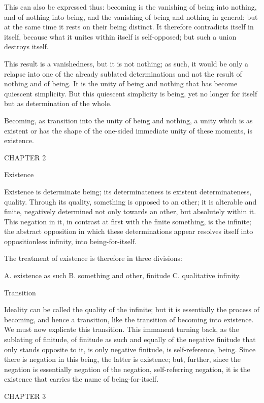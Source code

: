 This can also be expressed thus:
becoming is the vanishing of being into nothing,
and of nothing into being,
and the vanishing of being and nothing in general;
but at the same time it rests on their being distinct.
It therefore contradicts itself in itself,
because what it unites within itself is self-opposed;
but such a union destroys itself.

This result is a vanishedness, but it is not nothing;
as such, it would be only a relapse into one of
the already sublated determinations
and not the result of nothing and of being.
It is the unity of being and nothing
that has become quiescent simplicity.
But this quiescent simplicity is being,
yet no longer for itself but as determination of the whole.

Becoming, as transition into
the unity of being and nothing,
a unity which is as existent
or has the shape of the one-sided
immediate unity of these moments,
is existence.

CHAPTER 2

Existence

Existence is determinate being;
its determinateness is existent determinateness, quality.
Through its quality, something is opposed to an other;
it is alterable and finite,
negatively determined not only towards an other,
but absolutely within it.
This negation in it,
in contrast at first
with the finite something,
is the infinite;
the abstract opposition
in which these determinations appear
resolves itself into oppositionless infinity,
into being-for-itself.

The treatment of existence is therefore in three divisions:

A. existence as such
B. something and other, finitude
C. qualitative infinity.

Transition

Ideality can be called the
quality of the infinite;
but it is essentially
the process of becoming,
and hence a transition,
like the transition
of becoming into existence.
We must now explicate this transition.
This immanent turning back,
as the sublating of finitude,
of finitude as such
and equally of the negative finitude
that only stands opposite to it,
is only negative finitude,
is self-reference, being.
Since there is negation
in this being,
the latter is existence;
but, further, since the
negation is essentially
negation of the negation,
self-referring negation,
it is the existence that
carries the name of
being-for-itself.

CHAPTER 3

